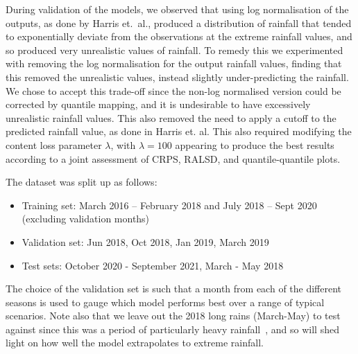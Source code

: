 \documentclass[../main.tex]{subfiles}
\begin{document}
During validation of the models, we observed that using log normalisation of the outputs, as done by Harris et.~al., produced a distribution of rainfall that tended to exponentially deviate from the observations at the extreme rainfall values, and so produced very unrealistic values of rainfall. To remedy this we experimented with removing the log normalisation for the output rainfall values, finding that this removed the unrealistic values, instead slightly under-predicting the rainfall. We chose to accept this trade-off since the non-log normalised version could be corrected by quantile mapping, and it is undesirable to have excessively unrealistic rainfall values. This also removed the need to apply a cutoff to the predicted rainfall value, as done in Harris et. al. This also required modifying the content loss parameter $\lambda$, with $\lambda=100$ appearing to produce the best results according to a joint assessment of CRPS, RALSD, and quantile-quantile plots.

The dataset was split up as follows:
\begin{itemize}
    \item Training set: March 2016 – February 2018 and July 2018 – Sept 2020 (excluding validation months)
    \item Validation set: Jun 2018, Oct 2018, Jan 2019, March 2019
    \item Test sets: October 2020 - September 2021, March - May 2018
\end{itemize}
The choice of the validation set is such that a month from each of the different seasons is used to gauge which model performs best over a range of typical scenarios. Note also that we leave out the 2018 long rains (March-May) to test against since this was a period of particularly heavy rainfall~\citep{kilavi_extreme_2018}, and so will shed light on how well the model extrapolates to extreme rainfall. 
\end{document}
